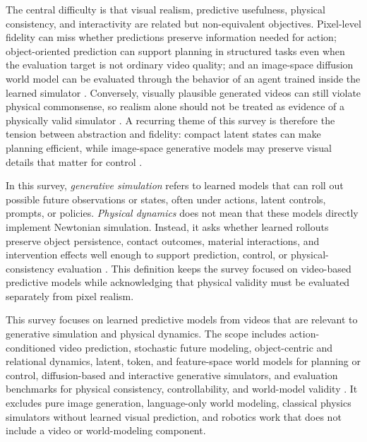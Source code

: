 The central difficulty is that visual realism, predictive usefulness, physical consistency, and interactivity are related but non-equivalent objectives. Pixel-level fidelity can miss whether predictions preserve information needed for action; object-oriented prediction can support planning in structured tasks even when the evaluation target is not ordinary video quality; and an image-space diffusion world model can be evaluated through the behavior of an agent trained inside the learned simulator \cite{oh2015_action_conditional_video_prediction_prov,janner2019_o2p2_prov,alonso2024_diamond_prov}. Conversely, visually plausible generated videos can still violate physical commonsense, so realism alone should not be treated as evidence of a physically valid simulator \cite{bansal2025_videophy_prov}. A recurring theme of this survey is therefore the tension between abstraction and fidelity: compact latent states can make planning efficient, while image-space generative models may preserve visual details that matter for control \cite{hafner2019_planet_prov,hafner2020_dreamer_prov,alonso2024_diamond_prov}.

In this survey, \emph{generative simulation} refers to learned models that can roll out possible future observations or states, often under actions, latent controls, prompts, or policies. \emph{Physical dynamics} does not mean that these models directly implement Newtonian simulation. Instead, it asks whether learned rollouts preserve object persistence, contact outcomes, material interactions, and intervention effects well enough to support prediction, control, or physical-consistency evaluation \cite{janner2019_o2p2_prov,bansal2025_videophy_prov}. This definition keeps the survey focused on video-based predictive models while acknowledging that physical validity must be evaluated separately from pixel realism.

This survey focuses on learned predictive models from videos that are relevant to generative simulation and physical dynamics. The scope includes action-conditioned video prediction, stochastic future modeling, object-centric and relational dynamics, latent, token, and feature-space world models for planning or control, diffusion-based and interactive generative simulators, and evaluation benchmarks for physical consistency, controllability, and world-model validity \cite{wu2024ivideogpt,assran2025vjepa2_prov,li2025worldmodelbench_prov}. It excludes pure image generation, language-only world modeling, classical physics simulators without learned visual prediction, and robotics work that does not include a video or world-modeling component.

